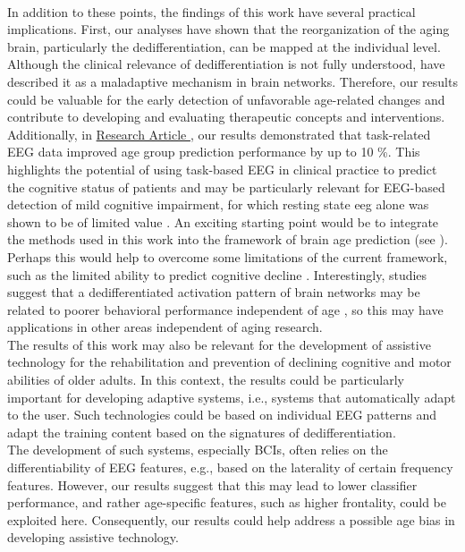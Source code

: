 \\
In addition to these points, the findings of this work have several practical implications. First, our analyses have shown that the reorganization of the aging brain, particularly the dedifferentiation, can be mapped at the individual level. Although the clinical relevance of dedifferentiation is not fully understood, \citeauthor{Fornito2015} \cite{Fornito2015} have described it as a maladaptive mechanism in brain networks. Therefore, our results could be valuable for the early detection of unfavorable age-related changes and contribute to developing and evaluating therapeutic concepts and interventions.\\
Additionally, in \hyperref[results:paperII]{Research Article }, our results demonstrated that task-related EEG data improved age group prediction performance by up to 10 \%. This highlights the potential of using task-based EEG in clinical practice to predict the cognitive status of patients and may be particularly relevant for EEG-based detection of mild cognitive impairment, for which resting state \gls{eeg} alone was shown to be of limited value \cite{Froehlich2021, Farina2020}. An exciting starting point would be to integrate the methods used in this work into the framework of brain age prediction (see ). Perhaps this would help to overcome some limitations of the current framework, such as the limited ability to predict cognitive decline \cite{Tetereva2023}. Interestingly, studies suggest that a dedifferentiated activation pattern of brain networks may be related to poorer behavioral performance independent of age \cite{Koen2019}, so this may have applications in other areas independent of aging research.\\
The results of this work may also be relevant for the development of assistive technology for the rehabilitation and prevention of declining cognitive and motor abilities of older adults. In this context, the results could be particularly important for developing adaptive systems, i.e., systems that automatically adapt to the user. Such technologies could be based on individual EEG patterns and adapt the training content based on the signatures of dedifferentiation.\\
The development of such systems, especially BCIs, often relies on the differentiability of EEG features, e.g., based on the laterality of certain frequency features. However, our results suggest that this may lead to lower classifier performance, and rather age-specific features, such as higher frontality, could be exploited here. Consequently, our results could help address a possible age bias in developing assistive technology.

